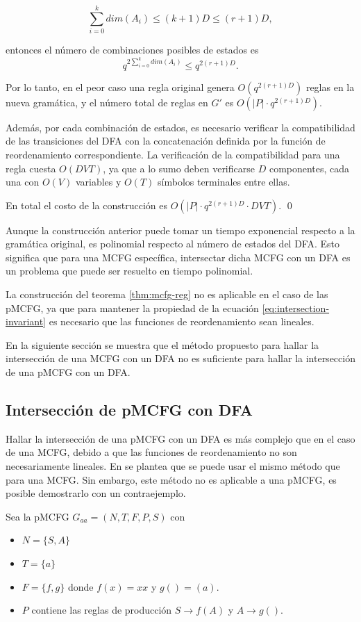 $$
    \sum_{i=0}^{k} dim(A_i) \leq (k+1)D \leq (r+1)D,
$$

entonces el número de combinaciones posibles de estados es
$$
    q^{2\sum_{i=0}^{k} dim(A_i)} \leq q^{2(r+1)D}.
$$

Por lo tanto, en el peor caso una regla original genera $O(q^{2(r+1)D})$ reglas en la nueva gramática, y el número total de reglas en $G'$ es $O(|P| \cdot q^{2(r+1)D})$.

Además, por cada combinación de estados, es necesario verificar la compatibilidad de las transiciones del DFA con la concatenación definida por la función de reordenamiento correspondiente. La verificación de la compatibilidad para una regla cuesta $O(DVT)$, ya que a lo sumo deben verificarse $D$ componentes, cada una con $O(V)$ variables y $O(T)$ símbolos terminales entre ellas.

En total el costo de la construcción es $O(|P| \cdot q^{2(r+1)D} \cdot DVT)$. \qed

Aunque la construcción anterior puede tomar un tiempo exponencial respecto a la gramática original, es polinomial respecto al número de estados del DFA. Esto significa que para una MCFG específica, intersectar dicha MCFG con un DFA es un problema que puede ser resuelto en tiempo polinomial.

La construcción del teorema \ref{thm:mcfg-reg} no es aplicable en el caso de las pMCFG, ya que para mantener la propiedad de la ecuación \ref{eq:intersection-invariant} es necesario que las funciones de reordenamiento sean lineales.

En la siguiente sección se muestra que el método propuesto para hallar la intersección de una MCFG con un DFA no es suficiente para hallar la intersección de una pMCFG con un DFA.

\subsection{Intersección de pMCFG con DFA}

Hallar la intersección de una pMCFG con un DFA es más complejo que en el caso de una MCFG, debido a que las funciones de reordenamiento no son necesariamente lineales. En \cite{Seki1991OnMC} se plantea que se puede usar el mismo método que para una MCFG. Sin embargo, este método no es aplicable a una pMCFG, es posible demostrarlo con un contraejemplo.

Sea la pMCFG $G_{aa} = (N, T, F, P, S)$ con
\begin{itemize}
    \item $N = \{S, A\}$
    \item $T = \{a\}$
    \item $F = \{f, g\}$ donde $f(x) = xx$ y $g() = (a)$.
    \item $P$ contiene las reglas de producción $S \to f(A)$ y $A \to g()$.
\end{itemize}

